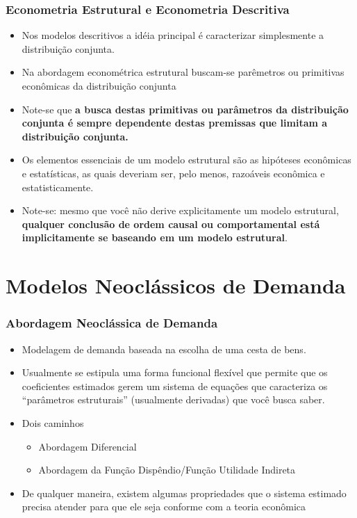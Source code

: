 \documentclass{beamer}
\begin{document}
\begin{frame}[fragile]\frametitle{Econometria Estrutural e Econometria Descritiva}
\small
  \begin{itemize}
      \item Nos modelos descritivos a idéia principal é caracterizar simplesmente a distribuição conjunta. 
      \item Na abordagem econométrica estrutural buscam-se parêmetros ou primitivas econômicas da distribuição conjunta
      \item Note-se que \textbf{a busca destas primitivas ou parâmetros da distribuição conjunta é sempre dependente destas
premissas que limitam a distribuição conjunta.} 
      \item Os elementos essenciais de um modelo estrutural são as hipóteses econômicas e estatísticas, as quais deveriam ser, pelo menos, razoáveis econômica e estatisticamente. 
      \item Note-se: mesmo que você não derive explicitamente um modelo estrutural, \textbf{qualquer conclusão de ordem causal ou
comportamental está implicitamente se baseando em um modelo estrutural}.
    \end{itemize}    
\end{frame}

\section{Modelos Neoclássicos de Demanda}

\begin{frame}[fragile]\frametitle{Abordagem Neoclássica de Demanda}
\begin{itemize}
  \item Modelagem de demanda baseada na escolha de uma cesta de bens.
  \item Usualmente se estipula uma forma funcional flexível que permite que os coeficientes estimados gerem um sistema de equações que caracteriza os ``parâmetros estruturais'' (usualmente derivadas) que você busca saber.
  \item Dois caminhos
  \begin{itemize}
    \item Abordagem Diferencial
    \item Abordagem da Função Dispêndio/Função Utilidade Indireta
  \end{itemize}
  \item De qualquer maneira, existem algumas propriedades que o sistema estimado precisa atender para que ele seja conforme com a teoria econômica
\end{itemize}
    


\end{frame}
\end{document}
